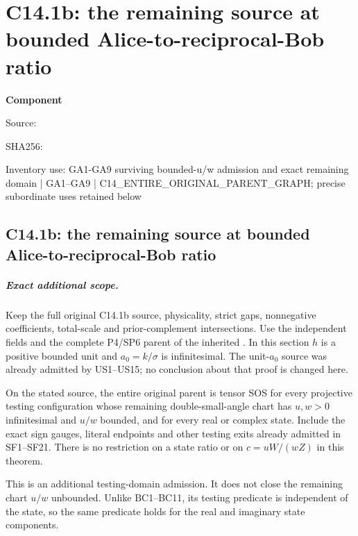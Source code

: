 \chapter{C14.1b: the remaining source at bounded Alice-to-reciprocal-Bob ratio}
\label{component:p50b4df0bb619}
\noindent\textbf{Component }\par
{\small\noindent Source: \par}
{\small\noindent SHA256: \par}
{\small\noindent Inventory use: GA1-GA9 surviving bounded-u/w admission and exact remaining domain | GA1--GA9 | C14\_\allowbreak{}ENTIRE\_\allowbreak{}ORIGINAL\_\allowbreak{}PARENT\_\allowbreak{}GRAPH; precise subordinate uses retained below\par}
\medskip
\section{C14.1b: the remaining source at bounded Alice-to-reciprocal-Bob ratio}
\label{p50b4df0bb619:sec:c141b-gamma-angular}

\paragraph{Exact additional scope.}
Keep the full original C14.1b source, physicality, strict gaps,
nonnegative coefficients, total-scale and prior-complement
intersections. Use the independent fields and the complete P4/SP6
parent of the inherited . In this
section $h$ is a positive bounded unit and $a_0=k/\sigma$ is
infinitesimal. The unit-$a_0$ source was already admitted by
US1--US15; no conclusion about that proof is changed here.

\begin{theorem}
On the stated source, the entire original parent is tensor SOS
for every projective testing configuration whose remaining
double-small-angle chart has $u,w>0$ infinitesimal and $u/w$
bounded, and for every real or complex state. Include the exact
sign gauges, literal endpoints and other testing exits already
admitted in SF1--SF21. There is no restriction on a state ratio
or on $c=uW/(wZ)$ in this theorem.
\end{theorem}

This is an additional testing-domain admission. It does not close
the remaining chart $u/w$ unbounded. Unlike BC1--BC11, its testing
predicate is independent of the state, so the same predicate holds
for the real and imaginary state components.

